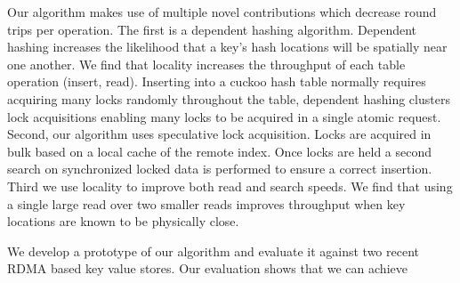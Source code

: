 Our algorithm makes use of multiple novel contributions
which decrease round trips per operation. The first is a
dependent hashing algorithm. Dependent hashing increases the
likelihood that a key's hash locations will be spatially
near one another. We find that locality increases the
throughput of each table operation (insert, read). Inserting
into a cuckoo hash table normally requires acquiring many
locks randomly throughout the table, dependent hashing
clusters lock acquisitions enabling many locks to be
acquired in a single atomic request. Second, our algorithm
uses speculative lock acquisition. Locks are acquired in
bulk based on a local cache of the remote index. Once locks
are held a second search on synchronized locked data is
performed to ensure a correct insertion. Third we use
locality to improve both read and search speeds. We find
that using a single large read over two smaller reads
improves throughput when key locations are known to be
physically close.


We develop a prototype of our algorithm and evaluate it
against two recent RDMA based key value stores. Our
evaluation shows that we can achieve ~